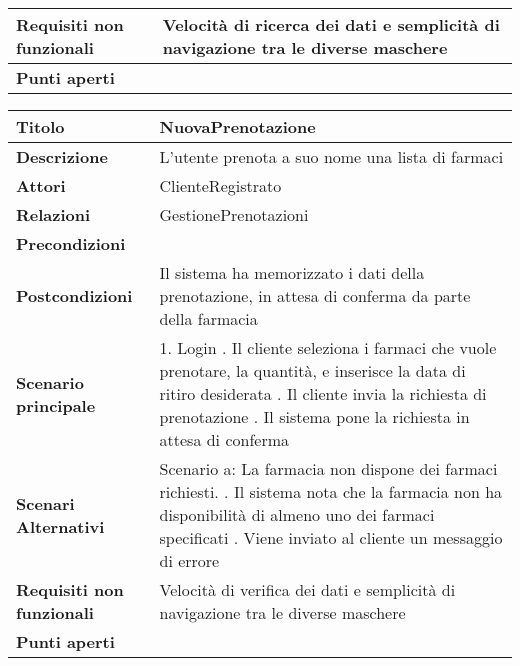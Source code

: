 \begin{tabular} {|P{4.5cm}|P{12.5cm}|}
\hline
  \textbf{Requisiti non funzionali} & Velocità di ricerca dei dati e semplicità di navigazione tra le diverse maschere\\
\hline
  \textbf{Punti aperti} &\\
\hline
\end{tabular}
\hfill
\break

\begin{tabular} {|P{4.5cm}|P{12.5cm}|}
\hline
  \textbf{Titolo} & NuovaPrenotazione\\
\hline
  \textbf{Descrizione} & L'utente prenota a suo nome una lista di farmaci\\
\hline
  \textbf{Attori} & ClienteRegistrato\\
\hline
  \textbf{Relazioni} & GestionePrenotazioni\\
\hline
  \textbf{Precondizioni} &\\
\hline
  \textbf{Postcondizioni} & Il sistema ha memorizzato i dati della prenotazione, in attesa di conferma da parte della farmacia\\
\hline
  \textbf{Scenario principale} & 1. Login . Il cliente seleziona i farmaci che vuole prenotare, la quantità, e inserisce la data di ritiro desiderata . Il cliente invia la richiesta di prenotazione . Il sistema pone la richiesta in attesa di conferma\\
\hline
  \textbf{Scenari Alternativi} & Scenario a: La farmacia non dispone dei farmaci richiesti. . Il sistema nota che la farmacia non ha disponibilità di almeno uno dei farmaci specificati . Viene inviato al cliente un messaggio di errore\\
\hline
  \textbf{Requisiti non funzionali} & Velocità di verifica dei dati e semplicità di navigazione tra le diverse maschere\\
\hline
  \textbf{Punti aperti} &\\
\hline
\end{tabular}
\hfill
\break


